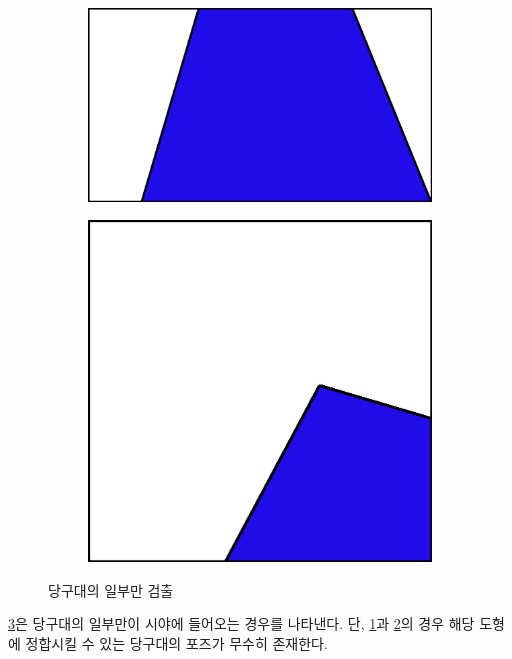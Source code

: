 \documentclass[10pt]{oblivoir}
\begin{document}
\begin{figure}
\begin{subfigure}{3.5cm}
        \includegraphics[width=\textwidth]{img/table-partial-view-filter-5.png}
        \caption{}
        \label{fig;table-partial-5-disable}
    \end{subfigure}
    \begin{subfigure}{3.5cm}
        \includegraphics[width=\textwidth]{img/table-partial-view-filter-2.png}
        \caption{}
        \label{fig;table-partial-2-disable}
    \end{subfigure}
    \caption{당구대의 일부만 검출}
    \label{fig;table-partial}
\end{figure}

\cref{fig;table-partial}은 당구대의 일부만이 시야에 들어오는 경우를 나타낸다. 단, \cref{fig;table-partial-5-disable}과 \cref{fig;table-partial-2-disable}의 경우 해당 도형에 정합시킬 수 있는 당구대의 포즈가 무수히 존재한다. 
\end{document}
